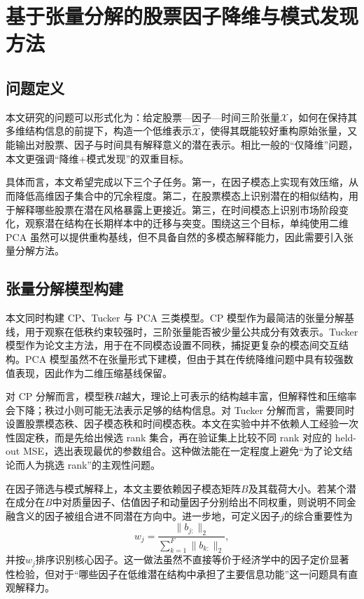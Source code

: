 \chapter{基于张量分解的股票因子降维与模式发现方法}

\section{问题定义}

本文研究的问题可以形式化为：给定股票—因子—时间三阶张量$\mathcal{X}$，如何在保持其多维结构信息的前提下，构造一个低维表示$\hat{\mathcal{X}}$，使得其既能较好重构原始张量，又能输出对股票、因子与时间具有解释意义的潜在表示。相比一般的“仅降维”问题，本文更强调“降维+模式发现”的双重目标。

具体而言，本文希望完成以下三个子任务。第一，在因子模态上实现有效压缩，从而降低高维因子集合中的冗余程度。第二，在股票模态上识别潜在的相似结构，用于解释哪些股票在潜在风格暴露上更接近。第三，在时间模态上识别市场阶段变化，观察潜在结构在长期样本中的迁移与突变。围绕这三个目标，单纯使用二维 PCA 虽然可以提供重构基线，但不具备自然的多模态解释能力，因此需要引入张量分解方法。

\section{张量分解模型构建}

本文同时构建 CP、Tucker 与 PCA 三类模型。CP 模型作为最简洁的张量分解基线，用于观察在低秩约束较强时，三阶张量能否被少量公共成分有效表示。Tucker 模型作为论文主方法，用于在不同模态设置不同秩，捕捉更复杂的模态间交互结构。PCA 模型虽然不在张量形式下建模，但由于其在传统降维问题中具有较强数值表现，因此作为二维压缩基线保留。

对 CP 分解而言，模型秩$R$越大，理论上可表示的结构越丰富，但解释性和压缩率会下降；秩过小则可能无法表示足够的结构信息。对 Tucker 分解而言，需要同时设置股票模态秩、因子模态秩和时间模态秩。本文在实验中并不依赖人工经验一次性固定秩，而是先给出候选 rank 集合，再在验证集上比较不同 rank 对应的 held-out MSE，选出表现最优的参数组合。这种做法能在一定程度上避免“为了论文结论而人为挑选 rank”的主观性问题。

在因子筛选与模式解释上，本文主要依赖因子模态矩阵$B$及其载荷大小。若某个潜在成分在$B$中对质量因子、估值因子和动量因子分别给出不同权重，则说明不同金融含义的因子被组合进不同潜在方向中。进一步地，可定义因子$j$的综合重要性为
\begin{equation}
w_j=\frac{\|b_{j:}\|_2}{\sum_{k=1}^{F}\|b_{k:}\|_2},
\end{equation}
并按$w_j$排序识别核心因子。这一做法虽然不直接等价于经济学中的因子定价显著性检验，但对于“哪些因子在低维潜在结构中承担了主要信息功能”这一问题具有直观解释力。

